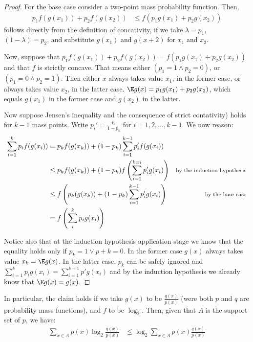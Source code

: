 \documentclass[
  10pt,
  dvipsnames,enabledeprecatedfontcommands]{scrartcl}
\begin{document}
\begin{proof}
For the base case consider a two-point mass probability function. Then,
\begin{align*}
p_1f(g(x_1))+ p_2f(g(x_2)) &\leq f(p_1g(x_1) + p_2g(x_2))
\end{align*}
\noindent follows directly from the definition of concativity, if we take $\lambda = p_1$, $(1-\lambda)=p_2$, and substitute $g(x_1)$ and $g(x+2)$ for $x_1$ and $x_2$.



Now, suppose that  $ p_1f(g(x_1))+ p_2f(g(x_2)) = f(p_1g(x_1) + p_2g(x_2))$ and that   $f$ is strictly concave. That means either $(p_1 = 1\wedge p_2 = 0)$, or $(p_1 = 0 \wedge p_2 =1)$. Then either $x$ always takes value $x_1$, in the former case, or always takes value $x_2$, in the latter case. $\E g (x) =  p_1 g(x_1) + p_2 g(x_2)$, which equals  $g(x_1)$ in the former case and $g(x_2)$ in the latter.


Now suppose Jensen's inequality and the consequence of strict contativity) holds for $k-1$ mass points. Write $p_i' = \frac{p_i}{1-p_k}$ for $i = 1, 2, \dots, k-1$. We now reason:
\begin{align*}
\sum_{i=1}^k p_i f(g(x_i)) & =
 p_kf(g(x_k)) + (1-p_k)\sum_{i =1}^{k-1}p_i'f(g(x_i)) &\\
 & \leq p_k f(g(x_k)) + (1-p_k)f\left( \sum_{i = 1}^{k=i}p_i' g(x_i) \right) & \mbox{\footnotesize by the induction hypothesis}\\ &\leq f\left( p_k(g(x_k)) + (1-p_k)\sum_{i = 1}^{k-1} p_i' g(x_i)\right) & \mbox{\footnotesize by the base case} \\
 & = f \left( \sum_{i}^k p_i g(x_i)\right)
 \end{align*}

Notice also that at the induction hypothesis application stage we know that the equality holds only if $p_k =1 \vee p+k = 0$. In the former case $g(x)$ always takes value $x_k = \E g(x)$. In the latter case, $p_k$ can be safely ignored and $\sum_{i=1}^{k}p_ig(x_i) = \sum_{i=1}^{k-1}p'g(x_i)$ and by the induction hypothesis we already know that $\E g(x) = g(x)$.


\end{proof}

In particular, the claim holds if we take \(g(x)\) to be
\(\frac{q(x)}{p(x)}\) (were both \(p\) and \(q\) are probability mass
functions), and \(f\) to be \(\log_2\). Then, given that \(A\) is the
support set of \(p\), we have: \begin{align*}
\sum_{x\in A}p(x) \log_2 \frac{q(x)}{p(x)} & \leq \log_2 \sum_{x\in A}p(x)\frac{q(x)}{p(x)}
\end{align*}
\end{document}
